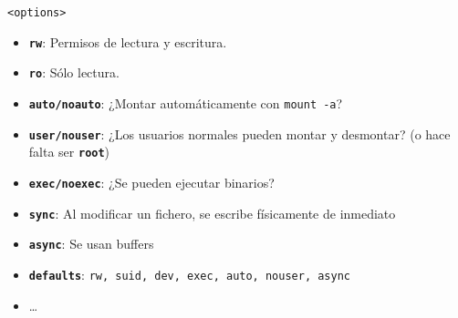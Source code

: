 \documentclass[ucs]{beamer}
\begin{document}
\begin{frame}[fragile]
\begin{verbatim}
<options>
\end{verbatim}
  \begin{itemize}
  \item \texttt{\textbf{rw}}: Permisos de lectura y escritura.
  \item \texttt{\textbf{ro}}: Sólo lectura.
  \item \texttt{\textbf{auto/noauto}}: ¿Montar automáticamente con \verb|mount -a|?
  \item \texttt{\textbf{user/nouser}}: ¿Los usuarios normales pueden montar y desmontar? 
(o hace falta ser \texttt{\textbf{root}}) 
  \item \texttt{\textbf{exec/noexec}}: ¿Se pueden ejecutar binarios?
  \item \texttt{\textbf{sync}}: Al modificar un fichero, se escribe físicamente de inmediato
  \item \texttt{\textbf{async}}: Se usan buffers 
  \item \texttt{\textbf{defaults}}: \verb|rw, suid, dev, exec, auto, nouser, async|
  \item \ldots 
  \end{itemize}
\end{frame}


\end{document}
